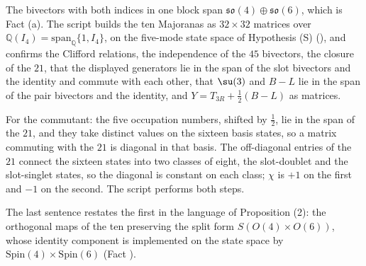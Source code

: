 The bivectors with both indices in one block span $\mathfrak{so}(4) \oplus \mathfrak{so}(6)$, which is Fact (a). The script builds the ten Majoranas as $32 \times 32$ matrices over $\mathbb{Q}(I_{4}) = \mathrm{span}_{\mathbb{Q}}\{1, I_{4}\}$, on the five-mode state space of Hypothesis (S) (), and confirms the Clifford relations, the independence of the $45$ bivectors, the closure of the $21$, that the displayed generators lie in the span of the slot bivectors and the identity and commute with each other, that $\su(3)$ and $B - L$ lie in the span of the pair bivectors and the identity, and $Y = T_{3R} + \tfrac12(B - L)$ as matrices.

For the commutant: the five occupation numbers, shifted by $\tfrac12$, lie in the span of the $21$, and they take distinct values on the sixteen basis states, so a matrix commuting with the $21$ is diagonal in that basis. The off-diagonal entries of the $21$ connect the sixteen states into two classes of eight, the slot-doublet and the slot-singlet states, so the diagonal is constant on each class; $\chi$ is $+1$ on the first and $-1$ on the second. The script performs both steps.

The last sentence restates the first in the language of Proposition (2): the orthogonal maps of the ten preserving the split form $S(O(4) \times O(6))$, whose identity component is implemented on the state space by $\mathrm{Spin}(4) \times \mathrm{Spin}(6)$ (Fact ).
